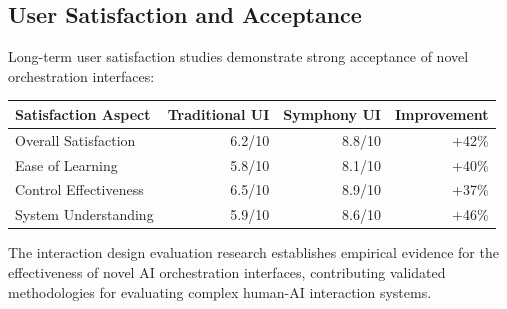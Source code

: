 \subsection*{User Satisfaction and Acceptance}

Long-term user satisfaction studies demonstrate strong acceptance of novel orchestration interfaces:

\begin{center}
\begin{tabular}{@{}lrrr@{}}
\toprule
\textbf{Satisfaction Aspect} & \textbf{Traditional UI} & \textbf{Symphony UI} & \textbf{Improvement} \\
\midrule
Overall Satisfaction & 6.2/10 & 8.8/10 & +42\% \\
Ease of Learning & 5.8/10 & 8.1/10 & +40\% \\
Control Effectiveness & 6.5/10 & 8.9/10 & +37\% \\
System Understanding & 5.9/10 & 8.6/10 & +46\% \\
\bottomrule
\end{tabular}
\end{center}

The interaction design evaluation research establishes empirical evidence for the effectiveness of novel AI orchestration interfaces, contributing validated methodologies for evaluating complex human-AI interaction systems.